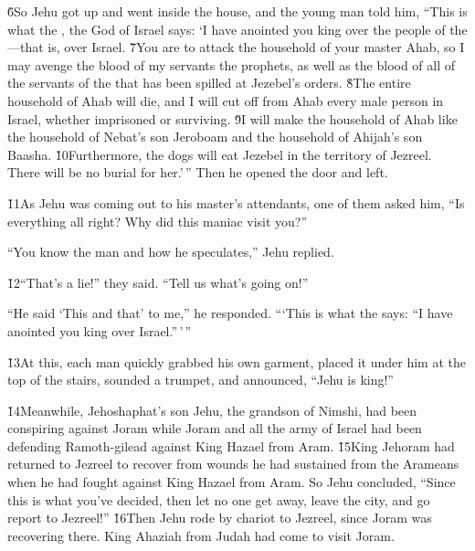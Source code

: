 \v{6}So Jehu got up and went inside the house, and the young man told him, ``This is what the , the God of Israel says: `I have anointed you king over the people of the ---that is, over Israel. \v{7}You are to attack the household of your master Ahab, so I may avenge the blood of my servants the prophets, as well as the blood of all of the servants of the  that has been spilled at Jezebel's orders. \v{8}The entire household of Ahab will die, and I will cut off from Ahab every male person in Israel, whether imprisoned or surviving. \v{9}I will make the household of Ahab like the household of Nebat's son Jeroboam and the household of Ahijah's son Baasha. \v{10}Furthermore, the dogs will eat Jezebel in the territory of Jezreel. There will be no burial for her.'\,'' Then he opened the door and left.

\v{11}As Jehu was coming out to his master's attendants, one of them asked him, ``Is everything all right? Why did this maniac visit you?''

``You know the man and how he speculates,'' Jehu replied.

\v{12}``That's a lie!'' they said. ``Tell us what's going on!''

``He said `This and that' to me,'' he responded. ```This is what the  says: ``I have anointed you king over Israel.''\,'\,''

\v{13}At this, each man quickly grabbed his own garment, placed it under him at the top of the stairs, sounded a trumpet, and announced, ``Jehu is king!''

\v{14}Meanwhile, Jehoshaphat's son Jehu, the grandson of Nimshi, had been conspiring against Joram while Joram and all the army of Israel had been defending Ramoth-gilead against King Hazael from Aram. \v{15}King Jehoram had returned to Jezreel to recover from wounds he had sustained from the Arameans when he had fought against King Hazael from Aram. So Jehu concluded, ``Since this is what you've decided, then let no one get away, leave the city, and go report to Jezreel!'' \v{16}Then Jehu rode by chariot to Jezreel, since Joram was recovering there. King Ahaziah from Judah had come to visit Joram.

